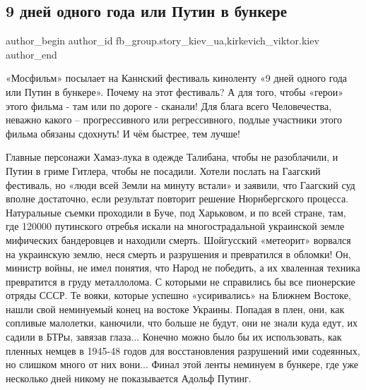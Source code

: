  
 
 
 
 
 
\subsection{9 дней одного года или Путин в бункере}
\label{sec:04_03_2022.fb.fb_group.story_kiev_ua.3.putin_v_bunkere}
 
\ifcmt
 author_begin
   author_id fb_group.story_kiev_ua,kirkevich_viktor.kiev
 author_end
\fi

«Мосфильм» посылает на Каннский фестиваль киноленту «9 дней одного года или
Путин в бункере». Почему на этот фестиваль? А для того, чтобы «герои» этого
фильма - там или по дороге - сканали! Для блага всего Человечества, неважно
какого – прогрессивного или регрессивного, подлые участники этого фильма
обязаны сдохнуть! И чём быстрее, тем лучше! 


Главные персонажи Хамаз-лука в одежде Талибана, чтобы не разоблачили, и Путин в
гриме Гитлера, чтобы не посадили. Хотели послать на Гаагский фестиваль, но
«люди всей Земли на минуту встали» и заявили, что Гаагский суд вполне
достаточно, если результат повторит решение Нюрнбергского процесса. Натуральные
съемки проходили в Буче, под Харьковом, и по всей стране, там, где 120000
путинского отребья искали на многострадальной украинской земле мифических
бандеровцев и находили смерть. Шойгусский «метеорит» ворвался на украинскую
землю, неся смерть и разрушения и превратился в обломки! Он, министр войны, не
имел понятия, что Народ не победить, а их хваленная техника превратится в груду
металлолома. С которыми не справились бы все пионерские отряды СССР. Те вояки,
которые успешно «усиривались» на Ближнем Востоке, нашли свой неминуемый конец
на востоке Украины. Попадая в плен, они, как сопливые малолетки, канючили, что
больше не будут, они не знали куда едут, их садили в БТРы, завязав глаза...
Конечно можно было бы их использовать, как пленных немцев в 1945-48 годов для
восстановления разрушений ими содеянных, но слишком много от них вони... Финал
этой ленты неминуем в бункере, где уже несколько дней никому не показывается
Адольф Путинг.

